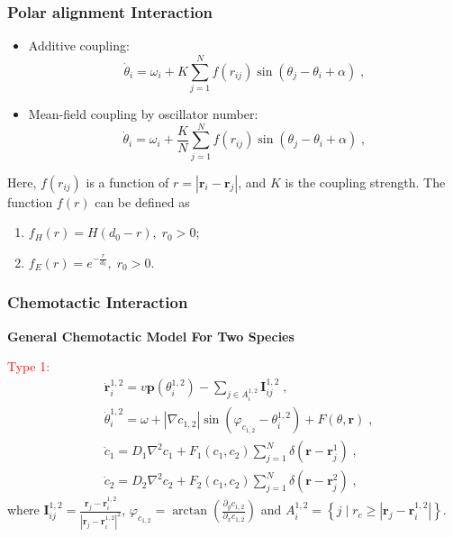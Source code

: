 \documentclass{article}
\begin{document}
\subsubsection{Polar alignment Interaction}
\begin{itemize}
    \item Additive coupling: 
    \begin{equation}
        \label{eq:additionalCouplingDotTheta}
        \dot{\theta}_i=\omega _i+K\sum_{j=1}^{N}f\left( r_{ij} \right)\sin \left( \theta _j-\theta _i+\alpha \right)\;,
    \end{equation}
    \item Mean-field coupling by oscillator number:
    \begin{equation}
        \label{eq:particleDotTheta}
        \dot{\theta}_i=\omega _i+\frac{K}{N}\sum_{j=1}^N{f}\left( r_{ij} \right) \sin \left( \theta _j-\theta _i+\alpha \right) \;,
    \end{equation}
\end{itemize}
Here,  $f\left( r_{ij} \right)$ is a function of $r=\left| \mathbf{r}_i-\mathbf{r}_j \right|$, and $K$ is the coupling strength. 
The function $f\left( r \right)$ can be defined as
\begin{enumerate}
    \item $f_H\left( r \right)=H\left( d_0-r \right),\;r_0>0$;
    \item $f_E\left( r \right)=e^{-\frac{r}{d_0}},\;r_0>0$.
\end{enumerate}

\subsubsection{Chemotactic Interaction}
\noindent\textbf{General Chemotactic Model For Two Species}

\noindent\textcolor{red}{Type 1:}
\begin{subequations}
    \begin{align}
        &\dot{\mathbf{r}}_{i}^{1,2}=v\mathbf{p}\left( \theta _{i}^{1,2} \right) -\sum_{j\in A_{i}^{1,2}}{\mathbf{I}_{ij}^{1,2}\;,}\\
        &\dot{\theta}_{i}^{1,2}=\omega + \left| \nabla c_{1,2} \right|\sin \left( \varphi _{c_{1,2}}-\theta _{i}^{1,2} \right) +F\left( \theta ,\mathbf{r} \right) \;,\\
        &\dot{c}_1=D_1\nabla ^2c_1+F_1\left( c_1,c_2 \right) \sum_{j=1}^N{\delta \left( \mathbf{r}-\mathbf{r}_{j}^{1} \right) \;,}\\
        &\dot{c}_2=D_2\nabla ^2c_2+F_2\left( c_1,c_2 \right) \sum_{j=1}^N{\delta \left( \mathbf{r}-\mathbf{r}_{j}^{2} \right) \;,}
    \end{align}
\end{subequations}
where $\mathbf{I}_{ij}^{1,2}=\frac{\mathbf{r}_j-\mathbf{r}_{i}^{1,2}}{|\mathbf{r}_j-\mathbf{r}_{i}^{1,2}|^{2}}$, $\varphi _{c_{1,2}}=\arctan \left( \frac{\partial _yc_{1,2}}{\partial _xc_{1,2}} \right) $ and $A_{i}^{1,2}=\left\{ j\mid r_c\geqslant | \mathbf{r}_j-\mathbf{r}_{i}^{1,2} | \right\}$.
\end{document}
